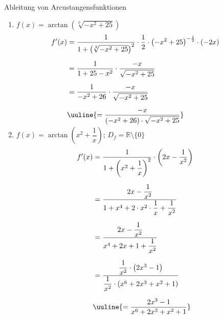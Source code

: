 \begin{Example}{Ableitung von Arcustangensfunktionen}{}
    \begin{enumerate}[leftmargin=*,label=\alph*)]
        \item {
            $f(x) = \arctan\left(\sqrt[2]{-x^{2} + 25}\right)$\\[-2.0ex]
            \begin{align*}
                f'(x) &= \dfrac{1}{1 + \left(\sqrt[2]{-x^{2} + 25}\right)^{2}} \cdot \dfrac{1}{2} \cdot \left(-x^{2} + 25\right)^{-\frac{1}{2}} \cdot \left(-2x\right) &&\\[1.5ex]
                &= \dfrac{1}{1 + 25 - x^{2}} \cdot \dfrac{-x}{\sqrt{- x^{2} + 25}} &&\\[1.5ex]
                &= \dfrac{1}{- x^{2} + 26} \cdot \dfrac{-x}{\sqrt{- x^{2} + 25}} &&\\[1.5ex]
                &\uuline{= \dfrac{-x}{\left(-x^{2} + 26\right) \cdot \sqrt{- x^{2} + 25}}} &&\\[-2.0ex]
            \end{align*}
            }
        \item {
            $f(x) = \arctan\left(x^{2} + \dfrac{1}{x}\right)$; \qquad $D_{f} = \mathbb{R} \setminus \{ 0 \}$ \\[-2.0ex]
            \begin{align*}
                f'(x) &= \dfrac{1}{1 + \left(x^{2} + \dfrac{1}{x}\right)^{2}} \cdot \left(2x - \dfrac{1}{x^{2}}\right) &&\\[1.5ex]
                &= \dfrac{2x - \dfrac{1}{x^{2}}}{1 + x^{4} + 2 \cdot x^{2} \cdot \dfrac{1}{x} + \dfrac{1}{x^{2}}} &&\\[1.5ex]
                &= \dfrac{2x - \dfrac{1}{x^{2}}}{x^{4} + 2x + 1 + \dfrac{1}{x^{2}}} &&\\[1.5ex]
                &= \dfrac{\dfrac{1}{x^{2}} \cdot \left(2x^{3} - 1\right)}{\dfrac{1}{x^{2}} \cdot \left(x^{6} + 2x^{3} + x^{2} +1\right)} &&\\[1.5ex]
                &\uuline{= \dfrac{2x^{3} - 1}{x^{6} + 2x^{3} + x^{2} +1}} &&
            \end{align*}
        }
    \end{enumerate}
\end{Example}